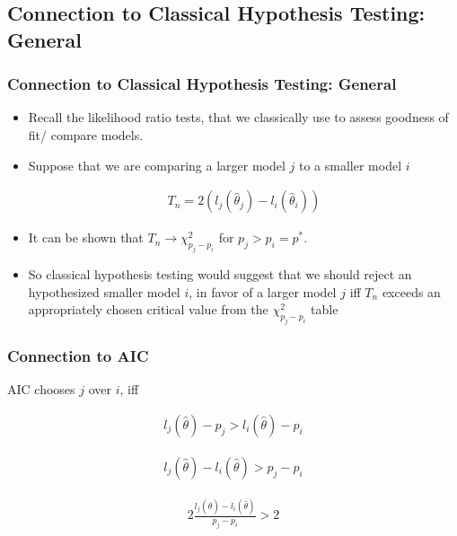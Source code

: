 \documentclass[
  shownotes,
  xcolor={svgnames},
  hyperref={colorlinks,citecolor=DarkBlue,linkcolor=DarkRed,urlcolor=DarkBlue}
  ]{beamer}
\begin{document}
\subsection{Connection to Classical Hypothesis Testing: General}
\begin{frame}[fragile]
\frametitle{Connection to Classical Hypothesis Testing: General}
\begin{itemize}
  \item Recall the likelihood ratio tests, that we classically use to assess goodness of fit/ compare models.
  \medskip
  \item Suppose that we are comparing a larger model $j$ to a smaller model $i$
   

   \begin{align}
   T_n=2(l_j(\hat \theta_j)-l_i(\hat \theta_i)) 
   \end{align}
   
  \item It can be shown that $T_n \rightarrow \chi^2_{p_j-p_i}$ for $p_j >p_i=p^*$. 
  \medskip
  \item  So classical hypothesis testing would suggest that we should reject an hypothesized smaller model $i$, in favor of a larger model $j$ iff $T_n$ exceeds an appropriately chosen critical value from the $\chi^2_{p_j-p_i}$ table
\end{itemize}
\end{frame}

\begin{frame}[fragile]
\frametitle{Connection to AIC}

AIC chooses $j$ over $i$, iff 

\begin{align}
l_j(\hat \theta) - p_j > l_i(\hat \theta) - p_i
\end{align}

\begin{align}
l_j(\hat \theta) - l_i(\hat \theta) > p_j - p_i
\end{align}

\begin{align}
2\frac{l_j(\hat \theta) - l_i(\hat \theta)}{p_j - p_i} > 2
\end{align}

\end{frame}
\end{document}
